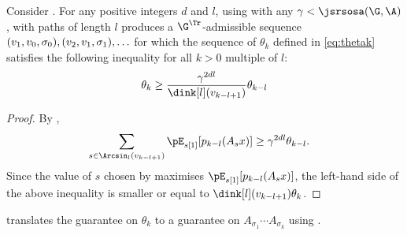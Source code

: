 \documentclass[11pt,twoside,a4paper,openright]{uclouvain-thesis}
\begin{document}
\begin{mylem}
  \label{lem:maxdegpathl}
  Consider .
  For any positive integers $d$ and $l$,
    using  with any $\gamma < \jsrsosa\\(\G,\A)$,
   with paths of length $l$
  produces a $\G^\Tr$-admissible sequence
  $(v_1,v_0,\\\sigma_0),(v_2,v_1,\sigma_1), \ldots$ %
  for which the sequence of $\theta_k$ defined in \eqref{eq:thetak}
  satisfies the following inequality for all $k > 0$ multiple of $l$:
  \begin{equation*}
    \theta_{k}
    \geq \frac{\gamma^{2dl}}{\dink[l](v_{k-l+1})}
    \theta_{k-l}
  \end{equation*}
  \begin{proof}
    By ,
    \begin{align*}
      \sum_{s \in \Arcsin_l(v_{k-l+1})} \pE_{s[1]}[p_{k-l}(A_s x)]
      & \geq \gamma^{2dl} \theta_{k-l}.
    \end{align*}
    Since the value of $s$ chosen by  maximises $\pE_{s[1]}[p_{k-l}(A_s x)]$,
    the left-hand side of the above inequality is smaller or equal to $\dink[l](v_{k-l+1})\theta_k$.
  \end{proof}
\end{mylem}

 translates the guarantee on $\theta_k$ to a guarantee on $A_{\sigma_1} \cdots A_{\sigma_k}$ using .
\end{document}

